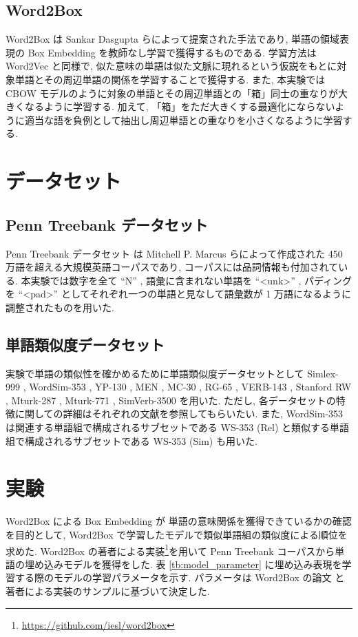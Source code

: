 \documentclass[twocolumn]{jarticle}     %
\begin{document}
\subsection{Word2Box}
Word2Box \cite{dasgupta-etal-2022-word2box} は Sankar Dasgupta らによって提案された手法であり, 単語の領域表現の Box Embedding を教師なし学習で獲得するものである. 
学習方法は Word2Vec \cite{word2vec} と同様で, 似た意味の単語は似た文脈に現れるという仮説をもとに対象単語とその周辺単語の関係を学習することで獲得する. 
また, 本実験では CBOW モデルのように対象の単語とその周辺単語との「箱」同士の重なりが大きくなるように学習する. 
加えて, 「箱」をただ大きくする最適化にならないように適当な語を負例として抽出し周辺単語との重なりを小さくなるように学習する. 

\section{データセット}
\subsection{Penn Treebank データセット}
Penn Treebank データセット \cite{ptb} は 	Mitchell P. Marcus らによって作成された 450 万語を超える大規模英語コーパスであり, コーパスには品詞情報も付加されている. 
本実験では数字を全て ``N'' , 語彙に含まれない単語を ``\textless unk\textgreater'' , パディングを ``\textless pad\textgreater'' としてそれぞれ一つの単語と見なして語彙数が 1 万語になるように調整されたものを用いた.

\subsection{単語類似度データセット}
実験で単語の類似性を確かめるために単語類似度データセットとして Simlex-999 \cite{simlex999}, WordSim-353 \cite{wordsim353}, YP-130 \cite{yp-130}, MEN \cite{men}, MC-30 \cite{mc-30}, RG-65 \cite{rg-65}, VERB-143 \cite{verb-143}, Stanford RW \cite{stanford-rw}, Mturk-287 \cite{mrutk-287}, Mturk-771 \cite{mturk-771}, SimVerb-3500 \cite{gerz-etal-2016-simverb} を用いた. 
ただし, 各データセットの特徴に関しての詳細はそれぞれの文献を参照してもらいたい. 
また, WordSim-353 は関連する単語組で構成されるサブセットである WS-353 (Rel) と類似する単語組で構成されるサブセットである WS-353 (Sim) も用いた. 

\section{実験}
Word2Box による Box Embedding が 単語の意味関係を獲得できているかの確認を目的として, Word2Box で学習したモデルで類似単語組の類似度による順位を求めた. 
Word2Box の著者による実装\footnote[1]{\url{https://github.com/iesl/word2box}}を用いて Penn Treebank コーパスから単語の埋め込みモデルを獲得をした. 
表 \ref{tb:model_parameter} に埋め込み表現を学習する際のモデルの学習パラメータを示す. 
パラメータは Word2Box の論文 \cite{dasgupta-etal-2022-word2box} と著者による実装のサンプルに基づいて決定した. 
\end{document}
